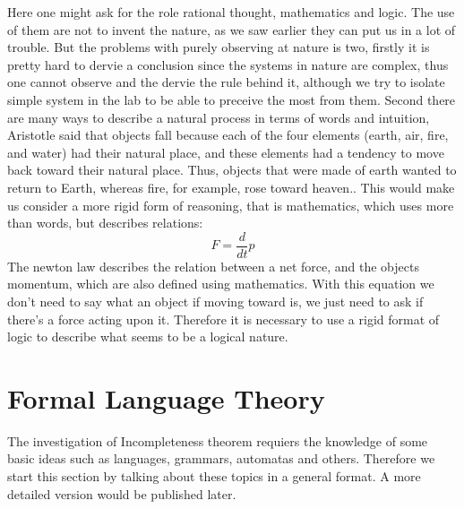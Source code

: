 \documentclass[10pt,a4paper]{article}
\newcounter{theo}
\begin{document}
                Here one might ask for the role rational thought, mathematics and logic. The use of them are not to invent the nature, as we saw earlier they can put us in a lot of trouble. But the problems with purely observing at nature is two, firstly it is pretty hard to dervie a conclusion since the systems in nature are complex, thus one cannot observe and the dervie the rule behind it, although we try to isolate simple system in the lab to be able to preceive the most from them. Second there are many ways to describe a natural process in terms of words and intuition,  Aristotle said that objects fall because each of the four elements (earth, air, fire, and water) had their natural place, and these elements had a tendency to move back toward their natural place. Thus, objects that were made of earth wanted to return to Earth, whereas fire, for example, rose toward heaven.\cite{greg-grav}. This would make us consider a more rigid form of reasoning, that is mathematics, which uses more than words, but describes relations:
                \begin{equation}
                    F = \frac{d}{dt} p
                \end{equation}
                The newton law describes the relation between a net force, and the objects momentum, which are also defined using mathematics. With this equation we don't need to say what an object if moving toward is, we just need to ask if there's a force acting upon it. Therefore it is necessary to use a rigid format of logic to describe what seems to be a logical nature.
        
            \section{Formal Language Theory}
                The investigation of Incompleteness theorem requiers the knowledge of some basic ideas such as languages, grammars, automatas and others. Therefore we start this section by talking about these topics in a general format. A more detailed version would be published later.\cite{Leary2019-ip}
\end{document}
